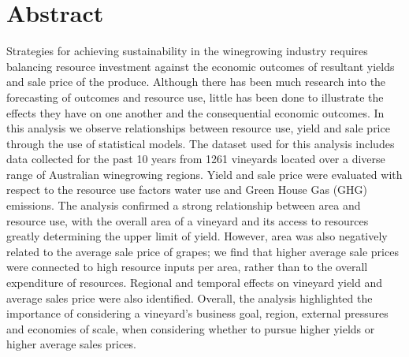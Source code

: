 \documentclass[10pt,letterpaper]{article}
\begin{document}
\section*{Abstract}

Strategies for achieving sustainability in the winegrowing industry requires balancing resource investment against the economic outcomes of resultant yields and sale price of the produce. Although there has been much research into the forecasting of outcomes and resource use, little has been done to illustrate the effects they have on one another and the consequential economic outcomes. In this analysis we observe relationships between resource use, yield and sale price through the use of statistical models. The dataset used for this analysis includes data collected for the past 10 years from 1261 vineyards located over a diverse range of Australian winegrowing regions. Yield and sale price were evaluated with respect to the resource use factors water use and Green House Gas (GHG) emissions. The analysis confirmed a strong relationship between area and resource use, with the overall area of a vineyard and its access to resources greatly determining the upper limit of yield. However, area was also negatively related to the average sale price of grapes; we find that higher average sale prices were connected to high resource inputs per area, rather than to the overall expenditure of resources. Regional and temporal effects on vineyard yield and average sales price were also identified. Overall, the analysis highlighted the importance of considering a vineyard's business goal, region, external pressures and economies of scale, when considering whether to pursue higher yields or higher average sales prices.

\end{document}
